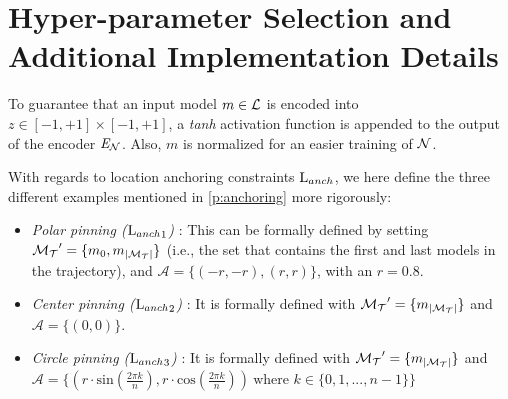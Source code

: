 \documentclass[letterpaper]{article} %
\begin{document}
% 



            
\clearpage

\appendix

      

    \section{Hyper-parameter Selection and Additional Implementation Details} \label{app:hyper}
            To guarantee that an input model $m \in \mathcal{L}$ is encoded into $z \in [-1, +1]\times [-1, +1]$, a \textit{tanh} activation function is appended to the output of the encoder $\mathit{E}_{\mathcal{N}}$. Also, $m$ is normalized for an easier training of $\mathcal{N}$.

            With regards to location anchoring constraints $\text{L}_{anch}$, we here define the three different examples mentioned in \cref{p:anchoring} more rigorously: %

            \begin{itemize}[itemsep=0em]
            \item \textit{Polar pinning (${\text{L}_{anch}}_1$) }: This can be formally defined by setting $\mathcal{M_T}^\prime = \{ m_{0}, m_{\left| \mathcal{M_T} \right|} \}$ (i.e., the set that contains the first and last models in the trajectory), and $\mathcal{A} = \{ (-r, -r), (r, r)\}$, with an $r=0.8$.
            \item \textit{Center pinning (${\text{L}_{anch}}_2$) }: It is formally defined with $\mathcal{M_T}^\prime = \{ m_{\left| \mathcal{M_T} \right|} \}$ and $\mathcal{A} = \{(0, 0)\}$.
            \item \textit{Circle pinning (${\text{L}_{anch}}_3$) }: It is formally defined with $\mathcal{M_T}^\prime = \{ m_{\left| \mathcal{M_T} \right|} \}$ and $\mathcal{A} = \{(r \cdot \text{sin}(\frac{2 \pi k}{n}) , r \cdot \text{cos}(\frac{2 \pi k}{n}))\ \text{where } k \in \{0, 1, ...,  n-1\}  \}$
            \end{itemize}

\end{document}
